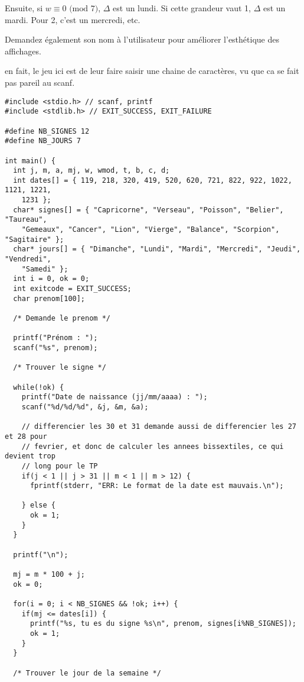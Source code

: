 \documentclass[10pt]{article}\usepackage[correction]{esial}
\begin{document}
Ensuite, si $w\equiv 0\textrm{ (mod }7)$, $\Delta$ est un lundi. Si cette
grandeur vaut 1, $\Delta$ est un mardi. Pour 2, c'est un mercredi, etc.

\Question Demandez également son nom à l'utilisateur pour améliorer
l'esthétique des affichages.

\begin{Reponse}
  en fait, le jeu ici est de leur faire saisir une chaine de caractères, vu que
  ca se fait pas pareil au scanf.

\bigskip\noindent\begin{minipage}{\linewidth}
  \begin{Verbatim}[label=Reponse aux 3 questions de l'exercice 2 proposee par Julien]
#include <stdio.h> // scanf, printf
#include <stdlib.h> // EXIT_SUCCESS, EXIT_FAILURE

#define NB_SIGNES 12
#define NB_JOURS 7

int main() {
  int j, m, a, mj, w, wmod, t, b, c, d;
  int dates[] = { 119, 218, 320, 419, 520, 620, 721, 822, 922, 1022, 1121, 1221,
	1231 };
  char* signes[] = { "Capricorne", "Verseau", "Poisson", "Belier", "Taureau",
	"Gemeaux", "Cancer", "Lion", "Vierge", "Balance", "Scorpion", "Sagitaire" };
  char* jours[] = { "Dimanche", "Lundi", "Mardi", "Mercredi", "Jeudi", "Vendredi",
	"Samedi" };
  int i = 0, ok = 0; 
  int exitcode = EXIT_SUCCESS;
  char prenom[100];

  /* Demande le prenom */

  printf("Prénom : ");
  scanf("%s", prenom);

  /* Trouver le signe */

  while(!ok) {
    printf("Date de naissance (jj/mm/aaaa) : ");
    scanf("%d/%d/%d", &j, &m, &a);
  
    // differencier les 30 et 31 demande aussi de differencier les 27 et 28 pour
    // fevrier, et donc de calculer les annees bissextiles, ce qui devient trop
    // long pour le TP
    if(j < 1 || j > 31 || m < 1 || m > 12) {
      fprintf(stderr, "ERR: Le format de la date est mauvais.\n");

    } else {
      ok = 1;
    }
  }

  printf("\n");

  mj = m * 100 + j;
  ok = 0;

  for(i = 0; i < NB_SIGNES && !ok; i++) {
    if(mj <= dates[i]) {
      printf("%s, tu es du signe %s\n", prenom, signes[i%NB_SIGNES]);
      ok = 1;
    }
  }

  /* Trouver le jour de la semaine */


\end{Verbatim}
\end{minipage}
\end{Reponse}
\end{document}
